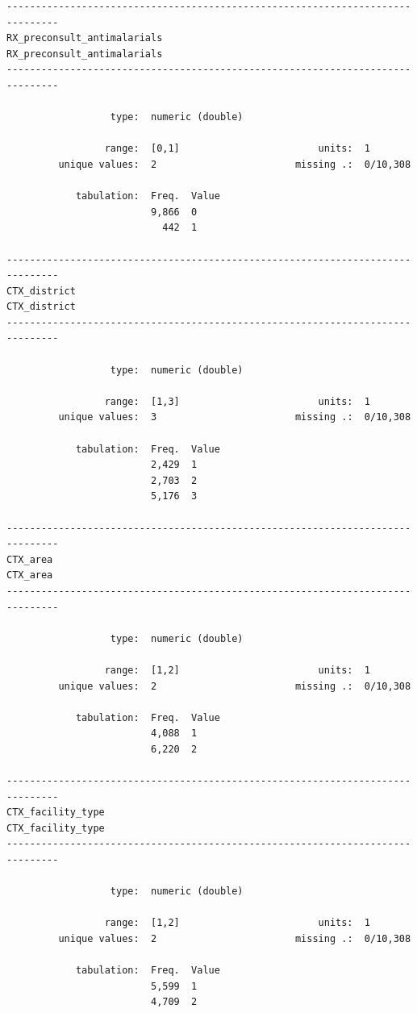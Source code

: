 \documentclass[
  letterpaper,
  DIV=11,
  numbers=noendperiod,
  oneside]{scrreprt}
\begin{document}
\begin{verbatim}
-------------------------------------------------------------------------------
RX_preconsult_antimalarials                         RX_preconsult_antimalarials
-------------------------------------------------------------------------------

                  type:  numeric (double)

                 range:  [0,1]                        units:  1
         unique values:  2                        missing .:  0/10,308

            tabulation:  Freq.  Value
                         9,866  0
                           442  1

-------------------------------------------------------------------------------
CTX_district                                                       CTX_district
-------------------------------------------------------------------------------

                  type:  numeric (double)

                 range:  [1,3]                        units:  1
         unique values:  3                        missing .:  0/10,308

            tabulation:  Freq.  Value
                         2,429  1
                         2,703  2
                         5,176  3

-------------------------------------------------------------------------------
CTX_area                                                               CTX_area
-------------------------------------------------------------------------------

                  type:  numeric (double)

                 range:  [1,2]                        units:  1
         unique values:  2                        missing .:  0/10,308

            tabulation:  Freq.  Value
                         4,088  1
                         6,220  2

-------------------------------------------------------------------------------
CTX_facility_type                                             CTX_facility_type
-------------------------------------------------------------------------------

                  type:  numeric (double)

                 range:  [1,2]                        units:  1
         unique values:  2                        missing .:  0/10,308

            tabulation:  Freq.  Value
                         5,599  1
                         4,709  2
\end{verbatim}
\end{document}
